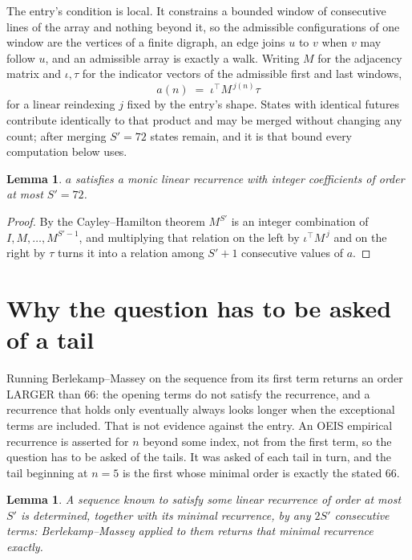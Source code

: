 \documentclass[11pt,a4paper]{article}
\theoremstyle{plain}
\newtheorem{lemma}[theorem]{Lemma}
\theoremstyle{definition}
\begin{document}
The entry's condition is local. It constrains a bounded window of consecutive lines of the
array and nothing beyond it, so the admissible configurations of one window are the vertices of
a finite digraph, an edge joins $u$ to $v$ when $v$ may follow $u$, and an admissible array is
exactly a walk. Writing $M$ for the adjacency matrix and $\iota,\tau$ for the indicator vectors
of the admissible first and last windows,
\[
a(n)\;=\;\iota^{\!\top}M^{\,j(n)}\tau
\]
for a linear reindexing $j$ fixed by the entry's shape. States with identical futures
contribute identically to that product and may be merged without changing any count; after
merging $S'=72$ states remain, and it is that bound every computation below uses.

\begin{lemma}\label{lem:cf}
$a$ satisfies a monic linear recurrence with integer coefficients of order at most $S'=72$.
\end{lemma}

\begin{proof}
By the Cayley--Hamilton theorem $M^{S'}$ is an integer combination of $I,M,\dots,M^{S'-1}$,
and multiplying that relation on the left by $\iota^{\!\top}M^{\,j}$ and on the right by
$\tau$ turns it into a relation among $S'+1$ consecutive values of $a$.
\end{proof}

\section{Why the question has to be asked of a tail}

Running Berlekamp--Massey on the sequence from its first term returns an order LARGER than $66$: the opening terms do not satisfy the recurrence, and a recurrence that holds only eventually always looks longer when the exceptional terms are included. That is not evidence against the entry. An OEIS empirical recurrence is asserted for $n$ beyond some index, not from the first term, so the question has to be asked of the tails. It was asked of each tail in turn, and the tail beginning at $n=5$ is the first whose minimal order is exactly the stated $66$.

\begin{lemma}\label{lem:bm}
A sequence known to satisfy some linear recurrence of order at most $S'$ is determined,
together with its minimal recurrence, by any $2S'$ consecutive terms: Berlekamp--Massey applied
to them returns that minimal recurrence exactly.
\end{lemma}
\end{document}
